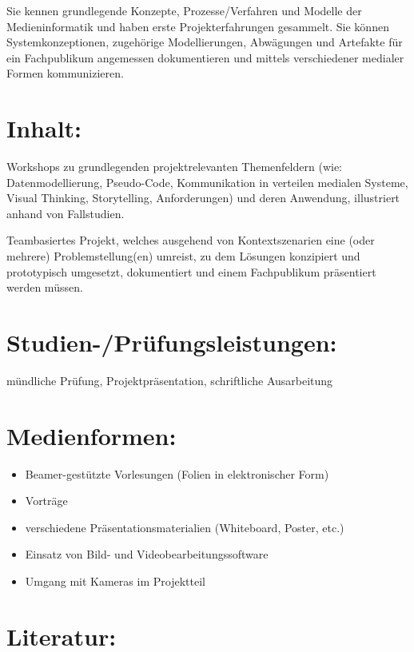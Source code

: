 Sie kennen grundlegende Konzepte, Prozesse/Verfahren und Modelle der
Medieninformatik und haben erste Projekterfahrungen gesammelt. Sie
können Systemkonzeptionen, zugehörige Modellierungen, Abwägungen und
Artefakte für ein Fachpublikum angemessen dokumentieren und mittels
verschiedener medialer Formen kommunizieren.

\section*{Inhalt:}\label{inhalt-9}

Workshops zu grundlegenden projektrelevanten Themenfeldern (wie:
Datenmodellierung, Pseudo-Code, Kommunikation in verteilen medialen
Systeme, Visual Thinking, Storytelling, Anforderungen) und deren
Anwendung, illustriert anhand von Fallstudien.

Teambasiertes Projekt, welches ausgehend von Kontextszenarien eine (oder
mehrere) Problemstellung(en) umreist, zu dem Lösungen konzipiert und
prototypisch umgesetzt, dokumentiert und einem Fachpublikum präsentiert
werden müssen.

\section*{Studien-/Prüfungsleistungen:}\label{studien-pruxfcfungsleistungen-5}

mündliche Prüfung, Projektpräsentation, schriftliche Ausarbeitung

\section*{Medienformen:}\label{medienformen-3}

\begin{itemize}
\item
  Beamer-gestützte Vorlesungen (Folien in elektronischer Form)
\item
  Vorträge
\item
  verschiedene Präsentationsmaterialien (Whiteboard, Poster, etc.)
\item
  Einsatz von Bild- und Videobearbeitungssoftware
\item
  Umgang mit Kameras im Projektteil
\end{itemize}

\section*{Literatur:}\label{literatur-7}

